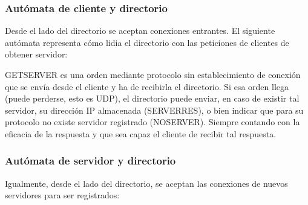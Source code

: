 \documentclass{article}
\begin{document}
\subsubsection{Autómata de cliente y directorio}

Desde el lado del directorio se aceptan conexiones entrantes. El siguiente autómata representa cómo lidia el directorio con las peticiones de clientes de obtener servidor:


GETSERVER es una orden mediante protocolo sin establecimiento de conexión que se envía desde el cliente y ha de recibirla el directorio. Si esa orden llega (puede perderse, esto es UDP), el directorio puede enviar, en caso de existir tal servidor, su dirección IP almacenada (SERVERRES), o bien indicar que para su protocolo no existe servidor registrado (NOSERVER). Siempre contando con la eficacia de la respuesta y que sea capaz el cliente de recibir tal respuesta.


\subsubsection{Autómata de servidor y directorio}

Igualmente, desde el lado del directorio, se aceptan las conexiones de nuevos servidores para ser registrados:

\end{document}
